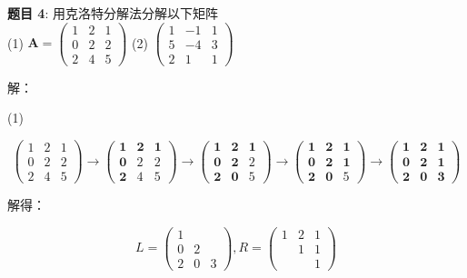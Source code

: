 \documentclass{article}
\begin{document}
\noindent\textbf{题目 4}: 用克洛特分解法分解以下矩阵 \\


(1)
$
\mathbf{A}
=
\begin{pmatrix}
    1 & 2 & 1 \\
    0 & 2 & 2 \\
    2 & 4 & 5
\end{pmatrix}
$
\quad
(2)
$
\begin{pmatrix}
    1 & -1 & 1 \\
    5 & -4 & 3 \\
    2 & 1 & 1
\end{pmatrix}
$

\noindent 解：

\noindent (1)

$$
\begin{pmatrix}
    1 & 2 & 1 \\
    0 & 2 & 2 \\
    2 & 4 & 5
\end{pmatrix}
\longrightarrow
\begin{pmatrix}
    \textbf{1} & \textbf{2} & \textbf{1} \\
    \textbf{0} & 2 & 2 \\
    \textbf{2} & 4 & 5
\end{pmatrix}
\longrightarrow
\begin{pmatrix}
    \textbf{1} & \textbf{2} & \textbf{1} \\
    \textbf{0} & \textbf{2} & 2 \\
    \textbf{2} & \textbf{0} & 5
\end{pmatrix}
\longrightarrow
\begin{pmatrix}
    \textbf{1} & \textbf{2} & \textbf{1} \\
    \textbf{0} & \textbf{2} & \textbf{1} \\
    \textbf{2} & \textbf{0} & 5
\end{pmatrix}
\longrightarrow
\begin{pmatrix}
    \textbf{1} & \textbf{2} & \textbf{1} \\
    \textbf{0} & \textbf{2} & \textbf{1} \\
    \textbf{2} & \textbf{0} & \textbf{3}
\end{pmatrix}
$$

解得：

$$
L = 
\begin{pmatrix}
    1 &   &   \\
    0 & 2 &   \\
    2 & 0 & 3
\end{pmatrix}, 
R = 
\begin{pmatrix}
    1 & 2 & 1 \\
      & 1 & 1 \\
      &   & 1
\end{pmatrix}
$$
\end{document}
